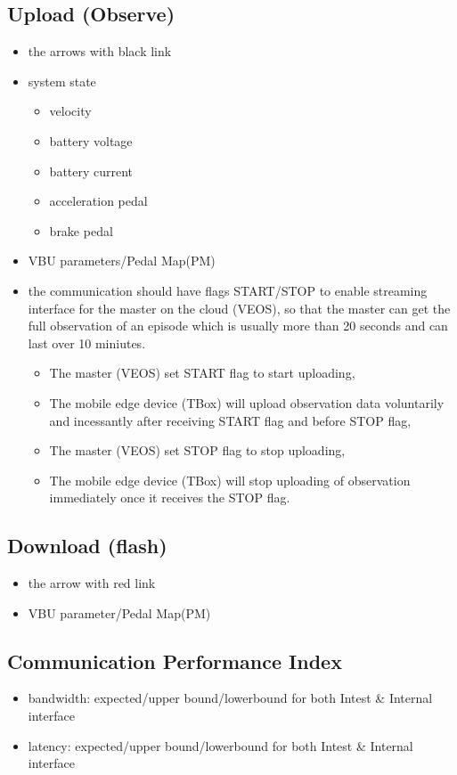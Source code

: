 \documentclass[a4paper, 11pt]{article}
\begin{document}
\subsection{Upload (Observe)}
\label{sec:org706f8ec}
\begin{itemize}
\item the arrows with black link
\item system state
\begin{itemize}
\item velocity
\item battery voltage
\item battery current
\item acceleration pedal
\item brake pedal
\end{itemize}
\item VBU parameters/Pedal Map(PM)
\item the communication should have flags START/STOP to enable streaming interface for the master on the cloud (VEOS), so that the master can get the full observation of an episode which is usually more than 20 seconds and can last over 10 miniutes.
\begin{itemize}
\item The master (VEOS) set START flag to start uploading,
\item The mobile edge device (TBox) will upload observation data voluntarily and incessantly after receiving START flag and before STOP flag,
\item The master (VEOS) set STOP flag to stop uploading,
\item The mobile edge device (TBox) will stop uploading of observation immediately once it receives the STOP flag.
\end{itemize}
\end{itemize}
\subsection{Download (flash)}
\label{sec:orgb3d2ae8}
\begin{itemize}
\item the arrow with red link
\item VBU parameter/Pedal Map(PM)
\end{itemize}
\subsection{Communication Performance Index}
\label{sec:org1d73d22}
\begin{itemize}
\item bandwidth: expected/upper bound/lowerbound for both Intest \& Internal interface
\item latency: expected/upper bound/lowerbound for both Intest \& Internal interface
\end{itemize}
\end{document}
